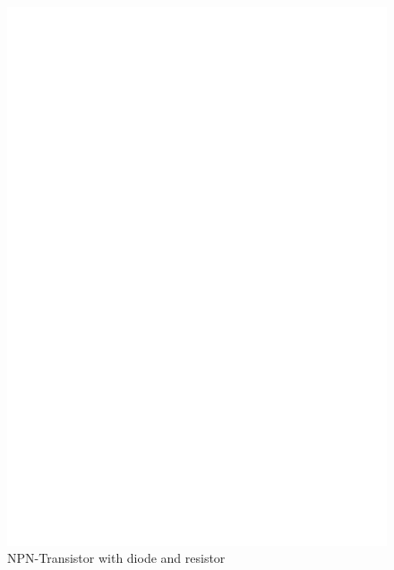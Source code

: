 \begin{figure}[H]
\centering
\includegraphics[]{../FIG/BJT_BU508D.eps}
\caption{NPN-Transistor with diode and resistor}
\label{fig:BJT-NPN-Di-R}
\end{figure}

